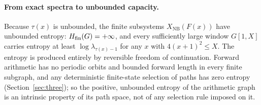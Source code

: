\paragraph{From exact spectra to unbounded capacity.} Because $\tau(x)$ is unbounded, the finite subsystems $X_{\mathrm{NB}}(F(x))$ have unbounded entropy: $H_{\mathrm{fin}}(G)=+\infty$, and every sufficiently large window $G[1,X]$ carries entropy at least $\log\lambda_{\tau(x)-1}$ for any $x$ with $4(x+1)^2\le X$. The entropy is produced entirely by reversible freedom of continuation. Forward arithmetic has no periodic orbits and bounded forward length in every finite subgraph, and any deterministic finite-state selection of paths has zero entropy (Section~\ref{sec:three}); so the positive, unbounded entropy of the arithmetic graph is an intrinsic property of its path space, not of any selection rule imposed on it.
